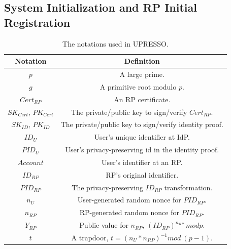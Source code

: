 \subsection{System Initialization and RP Initial Registration}
\begin{table}[tb]
    \caption{The notations used in UPRESSO.}
    \centering
    \begin{tabular}{|c|c|}
    \hline
    {Notation} & {Definition} \\
    \hline
    {$p$} & {A large prime.} \\
    \hline
    {$g$} & {A primitive root  modulo $p$.} \\
    \hline
    {$Cert_{RP}$} & {An RP certificate.} \\
    \hline
    {$SK_{Cert}$, $PK_{Cert}$} & {The private/public key to sign/verify $Cert_{RP}$.} \\
    \hline
    {$SK_{ID}$, $PK_{ID}$} & {The private/public key to sign/verify identity proof.} \\
    \hline
    {$ID_U$} & {User's unique identifier at IdP.} \\
    \hline
    {$PID_U$} & {User's privacy-preserving id in the identity proof.} \\
    \hline
    {$Account$} & {User's identifier at an RP.} \\
    \hline
    {$ID_{RP}$} & {RP's original identifier.} \\
    \hline
    {$PID_{RP}$} & {The privacy-preserving $ID_{RP}$ transformation.} \\
    \hline
    {$n_U$} & {User-generated random nonce for $PID_{RP}$. } \\
    \hline
    {$n_{RP}$} & {RP-generated random nonce for $PID_{RP}$. } \\
    \hline
    {$Y_{RP}$} & {Public value for $n_{RP}$, $(ID_{RP})^{n_{RP}} \ mod p$. } \\
    \hline
    {$t$} & {A trapdoor, $t=(n_U*n_{RP})^{-1} mod \ (p-1)$. } \\
    \hline
    \end{tabular}
    \label{tbl:notations}
\end{table}

